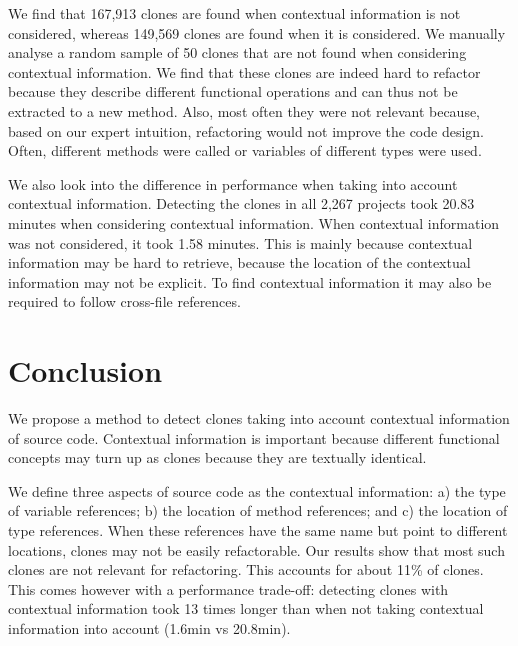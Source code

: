 \documentclass[journal]{IEEEtran}
\begin{document}
We find that 167,913 clones are found when contextual information is not considered, whereas 149,569 clones are found when it is considered. We manually analyse a random sample of 50 clones that are not found when considering contextual information. We find that these clones are indeed hard to refactor because they describe different functional operations and can thus not be extracted to a new method. Also, most often they were not relevant because, based on our expert intuition, refactoring would not improve the code design. Often, different methods were called or variables of different types were used.

We also look into the difference in performance when taking into account contextual information. Detecting the clones in all 2,267 projects took 20.83 minutes when considering contextual information. When contextual information was not considered, it took 1.58 minutes. This is mainly because contextual information may be hard to retrieve, because the location of the contextual information may not be explicit. To find contextual information it may also be required to follow cross-file references. %

\section{Conclusion}
We propose a method to detect clones taking into account contextual information of source code. Contextual information is important because different functional concepts may turn up as clones because they are textually identical.

We define three aspects of source code as the contextual information:  a) the type of variable references; b) the location of method references; and c) the location of type references. When these references have the same name but point to different locations, clones may not be easily refactorable. Our results show that most such clones are not relevant for refactoring. This accounts for about 11\% of clones. This comes however with a performance trade-off: detecting clones with contextual information took 13 times longer than when not taking contextual information into account (1.6min vs 20.8min).



\end{document}
